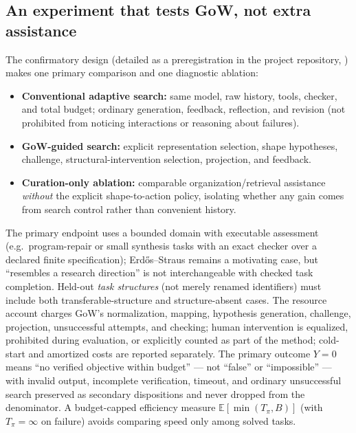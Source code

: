\documentclass[11pt]{article}
\theoremstyle{gowthm}
\theoremstyle{gowplain}
\begin{document}
\subsection{An experiment that tests GoW, not extra assistance}
\label{sec:superiority-exp}
The confirmatory design (detailed as a preregistration in the project
repository, ) makes one
primary comparison and one diagnostic ablation:
\begin{itemize}[nosep]
  \item \textbf{Conventional adaptive search:} same model, raw history, tools,
    checker, and total budget; ordinary generation, feedback, reflection, and
    revision (not prohibited from noticing interactions or reasoning about
    failures).
  \item \textbf{GoW-guided search:} explicit representation selection, shape
    hypotheses, challenge, structural-intervention selection, projection, and
    feedback.
  \item \textbf{Curation-only ablation:} comparable organization/retrieval
    assistance \emph{without} the explicit shape-to-action policy, isolating
    whether any gain comes from search control rather than convenient history.
\end{itemize}
The primary endpoint uses a bounded domain with executable assessment (e.g.\
program-repair or small synthesis tasks with an exact checker over a declared
finite specification); Erd\H{o}s--Straus remains a motivating case, but
``resembles a research direction'' is not interchangeable with checked task
completion. Held-out \emph{task structures} (not merely renamed identifiers)
must include both transferable-structure and structure-absent cases. The
resource account charges GoW's normalization, mapping, hypothesis generation,
challenge, projection, unsuccessful attempts, and checking; human intervention
is equalized, prohibited during evaluation, or explicitly counted as part of the
method; cold-start and amortized costs are reported separately. The primary
outcome $Y=0$ means ``no verified objective within budget'' --- not ``false'' or
``impossible'' --- with invalid output, incomplete verification, timeout, and
ordinary unsuccessful search preserved as secondary dispositions and never
dropped from the denominator. A budget-capped efficiency measure
$\mathbb{E}[\min(T_\pi, B)]$ (with $T_\pi = \infty$ on failure) avoids comparing
speed only among solved tasks.
\end{document}
